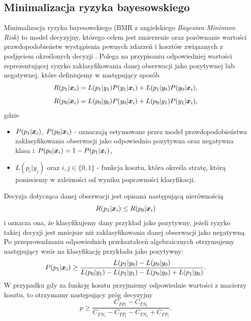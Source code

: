 \documentclass[inzynierska]{pwr_wmat_praca_dyplomowa}
\theoremstyle{plain}
\numberwithin{theorem}{chapter}
\theoremstyle{definition}
\numberwithin{theorem}{chapter}
\begin{document}
\subsection{Minimalizacja ryzyka bayesowskiego}
Minimalizacja ryzyka bayesowskiego (BMR z angielskiego \textit{Bayesian Minimum Risk}) to model decyzyjny, którego celem jest zmierzenie oraz porównanie wartości prawdopodobieństw wystąpienia pewnych zdarzeń i kosztów związanych z podjęciem określonych decyzji  \cite{CSCCFD}. Polega na przypisaniu odpowiedniej wartości reprezentującej ryzyko zaklasyfikowania danej obserwacji jako pozytywnej lub negatywnej, które definiujemy w następujący sposób
$$ R(p_1|\boldsymbol{x}_{i}) = L(p_1|y_1)P(y_1|\boldsymbol{x}_{i}) + L(p_1|y_0)P(y_0|\boldsymbol{x}_{i}) \text{,}$$
$$ R(p_0|\boldsymbol{x}_{i}) = L(p_0|y_0)P(y_0|\boldsymbol{x}_{i}) + L(p_0|y_1)P(y_1|\boldsymbol{x}_{i}) \text{,}$$
gdzie
\begin{itemize}
	\item $P(p_1|\boldsymbol{x}_{i})$, $P(p_0|\boldsymbol{x}_{i})$ - oznaczają estymowane przez model prawdopodobieństwa zaklasyfikowania obserwacji jako odpowiednio pozytywna oraz negatywna klasa i~$P(p_0|\boldsymbol{x}_{i}) = 1 - P(p_1|\boldsymbol{x}_{i})$,
	\item $L(p_{i}|y_{j})$ oraz $i,j \in \{0, 1\}$ - funkcja kosztu, która określa stratę, którą poniesiemy w zależności od wyniku poprawności klasyfikacji.
\end{itemize}{}
Decyzja dotycząca danej obserwacji jest opisana następującą nierównością
$$ R(p_1|\boldsymbol{x}_{i}) \leq R(p_0|\boldsymbol{x}_{i})$$
i oznacza ona, że klasyfikujemy dany przykład jako pozytywny, jeżeli ryzyko takiej decyzji jest mniejsze niż zaklasyfikowania danej obserwacji jako negatywną. 
Po przeprowadzaniu odpowiednich przekształceń algebraicznych otrzymujemy następujący wzór na klasyfikację przykładu jako pozytywny:
$$ P(p_1|\boldsymbol{x}_{i}) \ge \frac{L(p_1|y_0) - L(p_0|y_0)}{L(p_0|y_1) - L(p_1|y_1) - L(p_0|y_0) + L(p_1|y_0)} \text{.}$$
W przypadku gdy za funkcję kosztu przyjmiemy odpowiednie wartości z macierzy kosztu, to otrzymamy następujący próg decyzyjny
$$ p \ge \frac{C_{FP_i} - C_{TN_i}}{C_{FN_i} - C_{TP_i} - C_{TN_i} + C_{FP_i}} \text{.}$$
\end{document}
